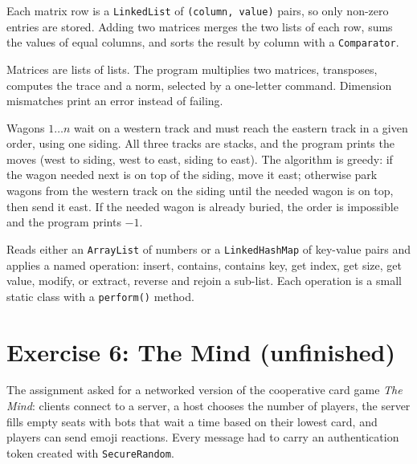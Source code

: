 \documentclass[11pt,a4paper]{article}
\begin{document}
\begin{description}[style=nextline]
\item[Sparse matrix addition (\texttt{Main (1).java})]
Each matrix row is a \texttt{LinkedList} of \texttt{(column, value)} pairs, so only non-zero entries are stored. Adding two matrices merges the two lists of each row, sums the values of equal columns, and sorts the result by column with a \texttt{Comparator}.

\item[Matrix operations (\texttt{Main (2).java})]
Matrices are lists of lists. The program multiplies two matrices, transposes, computes the trace and a norm, selected by a one-letter command. Dimension mismatches print an error instead of failing.

\item[Rearranging a train with stacks (\texttt{Main (3).java})]
Wagons $1\ldots n$ wait on a western track and must reach the eastern track in a given order, using one siding. All three tracks are stacks, and the program prints the moves (west to siding, west to east, siding to east). The algorithm is greedy: if the wagon needed next is on top of the siding, move it east; otherwise park wagons from the western track on the siding until the needed wagon is on top, then send it east. If the needed wagon is already buried, the order is impossible and the program prints $-1$.

\item[Collections (\texttt{Main (4).java})]
Reads either an \texttt{ArrayList} of numbers or a \texttt{LinkedHashMap} of key-value pairs and applies a named operation: insert, contains, contains key, get index, get size, get value, modify, or extract, reverse and rejoin a sub-list. Each operation is a small static class with a \texttt{perform()} method.
\end{description}

\section{Exercise 6: The Mind (unfinished)}

The assignment asked for a networked version of the cooperative card game \emph{The Mind}: clients connect to a server, a host chooses the number of players, the server fills empty seats with bots that wait a time based on their lowest card, and players can send emoji reactions. Every message had to carry an authentication token created with \texttt{SecureRandom}.
\end{document}
